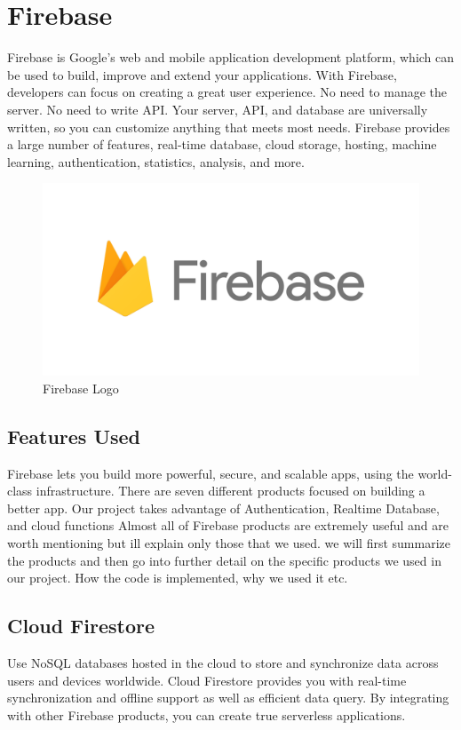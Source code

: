 \section{Firebase}
Firebase is Google's web and mobile application development platform, which can be used to build, improve and extend your applications. With Firebase, developers can focus on creating a great user experience. No need to manage the server. No need to write API. Your server, API, and database are universally written, so you can customize anything that meets most needs. Firebase provides a large number of features, real-time database, cloud storage, hosting, machine learning, authentication, statistics, analysis, and more.
\begin{figure}[!htb]
    \centering
    \includegraphics[scale=0.25]{img/firebaselogo.png}
    \caption{Firebase Logo}
    \label{fig:Firebase}
\end{figure}

\subsection{Features Used}
Firebase lets you build more powerful, secure, and scalable apps, using the world-class infrastructure. There are seven different products focused on building a better app. Our project takes advantage of Authentication, Realtime Database, and cloud functions Almost all of Firebase products are extremely useful and are worth mentioning but ill explain only those that we used. we will first summarize the products and then go into further detail on the specific products we used in our project. How the code is implemented, why we used it etc.
\subsection{Cloud Firestore}
Use NoSQL databases hosted in the cloud to store and synchronize data across users and devices worldwide. Cloud Firestore provides you with real-time synchronization and offline support as well as efficient data query. By integrating with other Firebase products, you can create true serverless applications.

